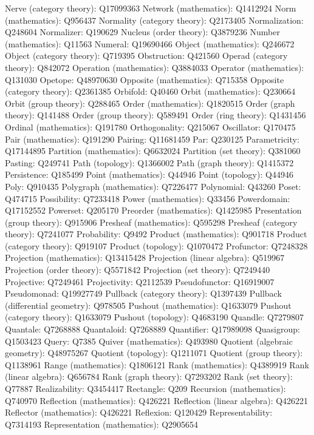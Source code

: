Nerve (category theory): Q17099363
Network (mathematics): Q1412924
Norm (mathematics): Q956437
Normality (category theory): Q2173405
Normalization: Q248604
Normalizer: Q190629
Nucleus (order theory): Q3879236
Number (mathematics): Q11563
Numeral: Q19690466
Object (mathematics): Q246672
Object (category theory): Q719395
Obstruction: Q421560
Operad (category theory): Q842072
Operation (mathematics): Q3884033
Operator (mathematics): Q131030
Opetope: Q48970630
Opposite (mathematics): Q715358
Opposite (category theory): Q2361385
Orbifold: Q40460
Orbit (mathematics): Q230664
Orbit (group theory): Q288465
Order (mathematics): Q1820515
Order (graph theory): Q141488
Order (group theory): Q589491
Order (ring theory): Q1431456
Ordinal (mathematics): Q191780
Orthogonality: Q215067
Oscillator: Q170475
Pair (mathematics): Q191290
Pairing: Q11681459
Par: Q230125
Parametricity: Q17144895
Partition (mathematics): Q6632024
Partition (set theory): Q381060
Pasting: Q249741
Path (topology): Q1366002
Path (graph theory): Q1415372
Persistence: Q185499
Point (mathematics): Q44946
Point (topology): Q44946
Poly: Q910435
Polygraph (mathematics): Q7226477
Polynomial: Q43260
Poset: Q474715
Possibility: Q7233418
Power (mathematics): Q33456
Powerdomain: Q17152552
Powerset: Q205170
Preorder (mathematics): Q1425985
Presentation (group theory): Q915906
Presheaf (mathematics): Q595298
Presheaf (category theory): Q7241077
Probability: Q9492
Product (mathematics): Q901718
Product (category theory): Q919107
Product (topology): Q1070472
Profunctor: Q7248328
Projection (mathematics): Q13415428
Projection (linear algebra): Q519967
Projection (order theory): Q5571842
Projection (set theory): Q7249440
Projective: Q7249461
Projectivity: Q2112539
Pseudofunctor: Q16919007
Pseudomonad: Q19927749
Pullback (category theory): Q1397439
Pullback (differential geometry): Q978505
Pushout (mathematics): Q1633079
Pushout (category theory): Q1633079
Pushout (topology): Q4683190
Quandle: Q7279807
Quantale: Q7268888
Quantaloid: Q7268889
Quantifier: Q17989098
Quasigroup: Q1503423
Query: Q7385
Quiver (mathematics): Q493980
Quotient (algebraic geometry): Q48975267
Quotient (topology): Q1211071
Quotient (group theory): Q1138961
Range (mathematics): Q1806121
Rank (mathematics): Q4389919
Rank (linear algebra): Q656784
Rank (graph theory): Q7293202
Rank (set theory): Q77887
Realizability: Q3454417
Rectangle: Q209
Recursion (mathematics): Q740970
Reflection (mathematics): Q426221
Reflection (linear algebra): Q426221
Reflector (mathematics): Q426221
Reflexion: Q120429
Representability: Q7314193
Representation (mathematics): Q2905654
